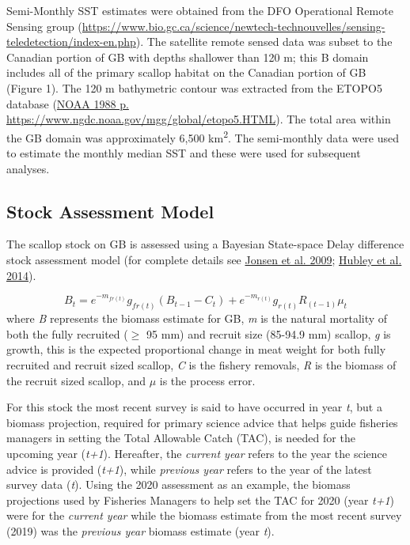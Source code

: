 \documentclass[
]{article}
\begin{document}
Semi-Monthly SST estimates were obtained from the DFO Operational Remote Sensing group (\url{https://www.bio.gc.ca/science/newtech-technouvelles/sensing-teledetection/index-en.php}). The satellite remote sensed data was subset to the Canadian portion of GB with depths shallower than 120 m; this B domain includes all of the primary scallop habitat on the Canadian portion of GB (Figure 1). The 120 m bathymetric contour was extracted from the ETOPO5 database (\protect\hyperlink{ref-noaaDataAnnouncement88MGG021988}{NOAA 1988 p. https://www.ngdc.noaa.gov/mgg/global/etopo5.HTML}). The total area within the GB domain was approximately 6,500 km\textsuperscript{2}. The semi-monthly data were used to estimate the monthly median SST and these were used for subsequent analyses.

\hypertarget{stock-assessment-model}{%
\subsection{Stock Assessment Model}\label{stock-assessment-model}}

The scallop stock on GB is assessed using a Bayesian State-space Delay difference stock assessment model (for complete details see \protect\hyperlink{ref-jonsenGeorgesBankScallop2009}{Jonsen et al. 2009}; \protect\hyperlink{ref-hubleyGeorgesBankBrowns2014}{Hubley et al. 2014}).

\[  B_{t} = e^{-m_{fr(t)}} g_{fr(t)} (B_{t-1} - C_{t}) + e^{-m_{r(t)}} g_{r(t)} R_{(t-1)}\mu_t  \]
where \emph{B} represents the biomass estimate for GB, \emph{m} is the natural mortality of both the fully recruited (\(\geq\) 95 mm) and recruit size (85-94.9 mm) scallop, \emph{g} is growth, this is the expected proportional change in meat weight for both fully recruited and recruit sized scallop, \emph{C} is the fishery removals, \emph{R} is the biomass of the recruit sized scallop, and \(\mu\) is the process error.

For this stock the most recent survey is said to have occurred in year \emph{t}, but a biomass projection, required for primary science advice that helps guide fisheries managers in setting the Total Allowable Catch (TAC), is needed for the upcoming year (\emph{t+1}). Hereafter, the \emph{current year} refers to the year the science advice is provided (\emph{t+1}), while \emph{previous year} refers to the year of the latest survey data (\emph{t}). Using the 2020 assessment as an example, the biomass projections used by Fisheries Managers to help set the TAC for 2020 (year \emph{t+1}) were for the \emph{current year} while the biomass estimate from the most recent survey (2019) was the \emph{previous year} biomass estimate (year \emph{t}).
\end{document}
